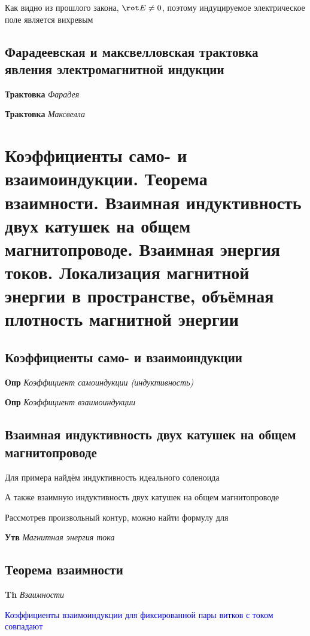 \documentclass[a4paper, 14pt]{article}
\begin{document}
    Как видно из прошлого закона, $\rot E \neq 0$, поэтому индуцируемое электрическое поле является вихревым
    
    \subsection{Фарадеевская и максвелловская трактовка явления электромагнитной индукции}
    
    \textbf{Трактовка} \textit{Фарадея}
    
    \textbf{Трактовка} \textit{Максвелла}
    
    \section{Коэффициенты само- и взаимоиндукции.
    Теорема взаимности.
    Взаимная индуктивность двух катушек на общем магнитопроводе.
    Взаимная энергия токов.
    Локализация магнитной энергии в пространстве, объёмная плотность магнитной энергии}
    
    \subsection{Коэффициенты само- и взаимоиндукции}
    
    \textbf{Опр} \textit{Коэффициент самоиндукции (индуктивность)}
    
    \textbf{Опр} \textit{Коэффициент взаимоиндукции}
    
    \subsection{Взаимная индуктивность двух катушек на общем магнитопроводе}
    
    Для примера найдём индуктивность идеального соленоида
    
    А также взаимную индуктивность двух катушек на общем магнитопроводе
    
    Рассмотрев произвольный контур, можно найти формулу для
    
    \textbf{Утв} \textit{Магнитная энергия тока}
    
    \subsection{Теорема взаимности}
    
    \textbf{Th} \textit{Взаимности}
    
    \textcolor{blue}{Коэффициенты взаимоиндукции для фиксированной пары витков с током совпадают}
    
\end{document}
